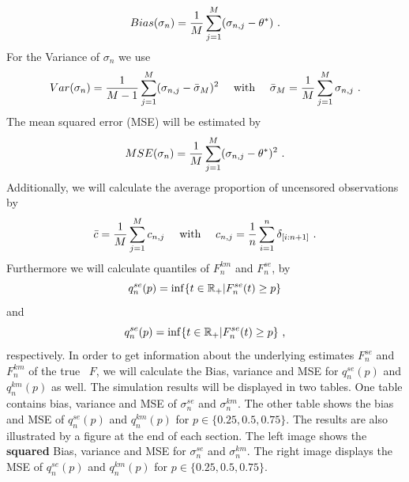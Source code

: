 $$Bias(\sigma_n) = \frac{1}{M}\sum_{j=1}^{M}(\sigma_{n,j} - \theta^*)\textrm{ .}$$
For the Variance of $\sigma_n$ we use
$$Var(\sigma_n) = \frac{1}{M-1}\sum_{j=1}^{M}(\sigma_{n,j} - \bar\sigma_M)^2 \quad\text{ with }\quad \bar\sigma_M = \frac{1}{M} \sum_{j=1}^{M} \sigma_{n,j}\textrm{ .}$$
The mean squared error (MSE) will be estimated by
$$MSE(\sigma_n) = \frac{1}{M}\sum_{j=1}^{M}(\sigma_{n,j} - \theta^*)^2\textrm{ .}$$ 
Additionally, we will calculate the average proportion of uncensored observations by
$$\bar c = \frac{1}{M} \sum_{j=1}^{M} c_{n,j} \quad\textrm{ with } \quad c_{n,j} = \frac{1}{n} \sum_{i=1}^{n} \delta_{[i:n+1]}\textrm{ .}$$
Furthermore we will calculate quantiles of $F_n^{km}$ and $F_n^{se}$, by
$$q_n^{se}(p) = \inf\{t \in \mathbb{R}_+| F_n^{se}(t) \geq p\}$$
and
$$q_n^{se}(p) = \inf\{t \in \mathbb{R}_+| F_n^{se}(t) \geq p\}\textrm{ ,}$$
respectively. In order to get information about the underlying estimates $F_n^{se}$ and $F_n^{km}$ of the true \df\ $F$, we will calculate the Bias, variance and MSE for $q_n^{se}(p)$ and $q_n^{km}(p)$ as well. The simulation results will be displayed in two tables. One table contains bias, variance and MSE of $\sigma_n^{se}$ and $\sigma_{n}^{km}$. The other table shows the bias and MSE of $q_n^{se}(p)$ and $q_n^{km}(p)$ for $p\in\{0.25, 0.5, 0.75\}$. The results are also illustrated by a figure at the end of each section. The left image shows the \textbf{squared} Bias, variance and MSE for $\sigma_n^{se}$ and $\sigma_n^{km}$. The right image displays the MSE of $q_n^{se}(p)$ and $q_n^{km}(p)$ for $p\in\{0.25, 0.5, 0.75\}$.
%
%
%
